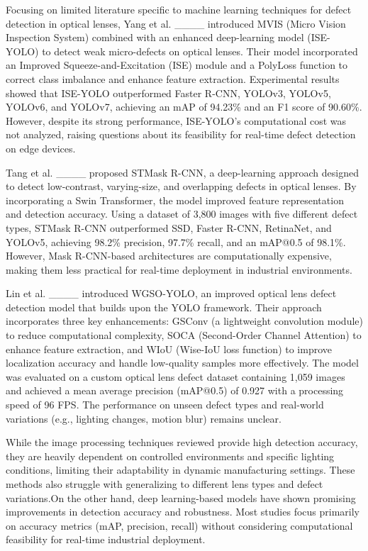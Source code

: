 Focusing on limited literature specific to machine learning techniques for defect detection in optical lenses, Yang et al. ____ introduced MVIS (Micro Vision Inspection System) combined with an enhanced deep-learning model (ISE-YOLO) to detect weak micro-defects on optical lenses. Their model incorporated an Improved Squeeze-and-Excitation (ISE) module and a PolyLoss function to correct class imbalance and enhance feature extraction. Experimental results showed that ISE-YOLO outperformed Faster R-CNN, YOLOv3, YOLOv5, YOLOv6, and YOLOv7, achieving an mAP of 94.23\% and an F1 score of 90.60\%. However, despite its strong performance, ISE-YOLO’s computational cost was not analyzed, raising questions about its feasibility for real-time defect detection on edge devices.

Tang et al. ____ proposed STMask R-CNN, a deep-learning approach designed to detect low-contrast, varying-size, and overlapping defects in optical lenses. By incorporating a Swin Transformer, the model improved feature representation and detection accuracy. Using a dataset of 3,800 images with five different defect types, STMask R-CNN outperformed SSD, Faster R-CNN, RetinaNet, and YOLOv5, achieving 98.2\% precision, 97.7\% recall, and an mAP@0.5 of 98.1\%. However, Mask R-CNN-based architectures are computationally expensive, making them less practical for real-time deployment in industrial environments.

Lin et al. ____ introduced WGSO-YOLO, an improved optical lens defect detection model that builds upon the YOLO framework. Their approach incorporates three key enhancements: GSConv (a lightweight convolution module) to reduce computational complexity, SOCA (Second-Order Channel Attention) to enhance feature extraction, and WIoU (Wise-IoU loss function) to improve localization accuracy and handle low-quality samples more effectively. The model was evaluated on a custom optical lens defect dataset containing 1,059 images and achieved a mean average precision (mAP@0.5) of 0.927 with a processing speed of 96 FPS. The performance on unseen defect types and real-world variations (e.g., lighting changes, motion blur) remains unclear.

While the image processing techniques reviewed provide high detection accuracy, they are heavily dependent on controlled environments and specific lighting conditions, limiting their adaptability in dynamic manufacturing settings. These methods also struggle with generalizing to different lens types and defect variations.On the other hand, deep learning-based models have shown promising improvements in detection accuracy and robustness. Most studies focus primarily on accuracy metrics (mAP, precision, recall) without considering computational feasibility for real-time industrial deployment.

